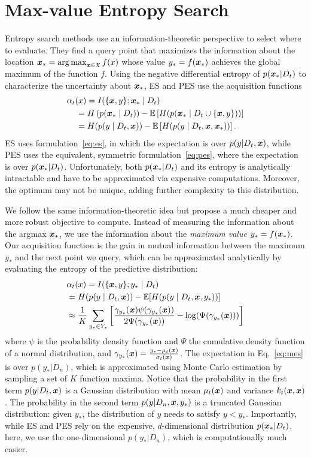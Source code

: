 \section{Max-value Entropy Search}
%
Entropy search methods use an information-theoretic perspective to select where to evaluate. They
%
 find a query point that maximizes the information about the location ${\boldsymbol{x}}_* = \operatorname{arg\,max}_{{\boldsymbol{x}} \in \mathfrak X} f(x)$ whose value $y_* = f({\boldsymbol{x}}_*)$ achieves the global maximum of the function $f$. Using the negative differential entropy of $p({\boldsymbol{x}}_* | D_t)$ to characterize the uncertainty about ${\boldsymbol{x}}_*$, ES and PES use the acquisition functions
 \begin{align}
&\alpha_t(x) = 
I(\{\vx,y\}; \vx_*\mid D_t) \\
&\;\;\;\;= H\left(p(\vx_*\mid D_t)\right)- \Ex\left[H(p(\vx_*\mid D_t\cup \{\vx, y\})) \right] \label{eq:es}\\
%
&\;\;\;\; = H(p(y\mid D_t,\vx))- \Ex\left[H(p(y\mid D_t, \vx, \vx_*)) \right] \label{eq:pes}.
%
\end{align}
%
ES uses formulation~\eqref{eq:es}, in which the expectation is over $p(y| D_t, {\boldsymbol{x}})$, while PES uses the equivalent, symmetric formulation~\eqref{eq:pes}, where the expectation is over $p({\boldsymbol{x}}_* | D_t)$. Unfortunately, both $p({\boldsymbol{x}}_* | D_t)$ and its entropy is analytically intractable and have to be approximated via expensive computations.
Moreover, the optimum may not be unique, adding further complexity to this distribution.
%
%

We follow the same information-theoretic idea but propose a much cheaper and more robust objective to compute. Instead of measuring the information about the argmax ${\boldsymbol{x}}_*$, we use the information about the \emph{maximum value} $y_* = f({\boldsymbol{x}}_*)$. 
Our acquisition function is the gain in mutual information between the maximum $y_*$ and the next point we query, which can be approximated analytically by evaluating the entropy of the predictive distribution:
\begin{align}
&\alpha_t(x) = 
I(\{{\boldsymbol{x}},y\}; y_*\mid D_t) \\
&= H(p(y\mid D_t, {\boldsymbol{x}})) - \mathbb E[H(p(y\mid D_t, {\boldsymbol{x}}, y_*)) ] \label{eq:mes} \\
& \approx \frac{1}{K}\sum_{y_*\in Y_*} \left[\frac{\gamma_{y_*}( {\boldsymbol{x}})\psi(\gamma_{y_*}( {\boldsymbol{x}}))}{2\Psi(\gamma_{y_*}({\boldsymbol{x}}))} - \log(\Psi(\gamma_{y_*}( {\boldsymbol{x}}))) \right] \label{eq:mesapprox}
\end{align}
%
where $\psi$ is the probability density function and $\Psi$ the cumulative density function of a normal distribution, and $\gamma_{y_*}({\boldsymbol{x}}) = \frac{y_* - \mu_t({\boldsymbol{x}})}{\sigma_t({\boldsymbol{x}})}$. %
The expectation in Eq.~\eqref{eq:mes} is over $p(y_*|D_n)$, which is approximated using Monte Carlo estimation by sampling a set of $K$ function maxima. %
 Notice that the probability in the first term $p(y | D_t, {\boldsymbol{x}})$ is a Gaussian distribution with mean $\mu_t({\boldsymbol{x}})$ and variance $k_t({\boldsymbol{x}},{\boldsymbol{x}})$. The probability in the second term $p(y | D_n, {\boldsymbol{x}}, y_*)$ is a truncated Gaussian distribution: given $y_*$, the distribution of $y$ needs to satisfy $y < y_*$.  Importantly, while ES and PES rely on the expensive, $d$-dimensional distribution $p({\boldsymbol{x}}_* | D_t)$, here, we use the one-dimensional $p(y_*|D_n)$, which is computationally much easier.

